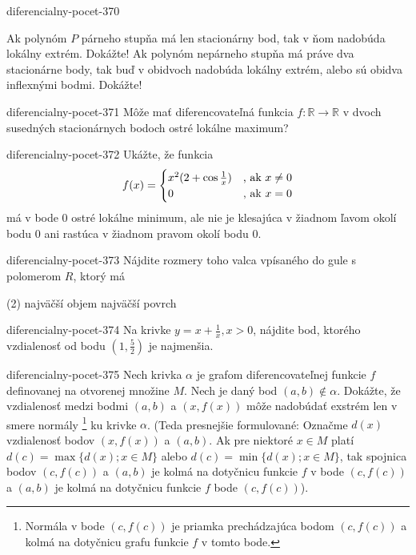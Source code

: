 \begin{defproblem}{diferencialny-pocet-370}
\begin{tasks}
\task
  Ak polynóm $P$ párneho stupňa má len stacionárny bod, tak v ňom nadobúda
  lokálny extrém. Dokážte!
\task
  Ak polynóm nepárneho stupňa má práve dva stacionárne body, tak buď v obidvoch
  nadobúda lokálny extrém, alebo sú obidva inflexnými bodmi. Dokážte!
\end{tasks}
\end{defproblem}

\begin{defproblem}{diferencialny-pocet-371}
Môže mať diferencovateľná funkcia $f:\mathbb{R} \rightarrow \mathbb{R}$ v dvoch
susedných stacionárnych bodoch ostré lokálne maximum?
\end{defproblem}

\begin{defproblem}{diferencialny-pocet-372}
Ukážte, že funkcia
\[
  f(x)=
    \begin{cases}
      x^2(2+\cos \frac{1}{x}) & $, ak $ x \neq 0 \\
      0 &  $, ak $ x=0
    \end{cases}
\]
má v bode $0$ ostré lokálne minimum, ale nie je klesajúca v žiadnom ľavom okolí
bodu $0$ ani rastúca v žiadnom pravom okolí bodu $0$.
\end{defproblem}

\begin{defproblem}{diferencialny-pocet-373}
Nájdite rozmery toho valca vpísaného do gule s polomerom $R$, ktorý má
\begin{tasks}(2)
\task najväčší objem
\task najväčší povrch
\end{tasks}
\end{defproblem}

\begin{defproblem}{diferencialny-pocet-374}
Na krivke $y=x+\frac{1}{x},x>0$, nájdite bod, ktorého vzdialenosť od bodu
$(1,\frac{5}{2})$ je najmenšia.
\end{defproblem}

\begin{defproblem}{diferencialny-pocet-375}
Nech krivka $\alpha$ je grafom diferencovateľnej funkcie $f$ definovanej na
otvorenej množine $M$. Nech je daný bod $(a,b)\notin \alpha$. Dokážte, že
vzdialenosť medzi bodmi $(a,b)$ a $(x,f(x))$ môže nadobúdať exstrém len v smere
normály \footnote{Normála v bode $(c,f(c))$ je priamka prechádzajúca bodom
$(c,f(c))$ a kolmá na dotyčnicu grafu funkcie $f$ v tomto bode.} ku krivke
$\alpha$. (Teda presnejšie formulované: Označme $d(x)$ vzdialenosť bodov
$(x,f(x))$ a $(a,b)$. Ak pre niektoré $x\in M$ platí $d(c)=\max \{d(x);x\in M\}$
alebo $d(c)=\min \{d(x);x\in M\}$, tak spojnica bodov $(c,f(c))$ a $(a,b)$ je
kolmá na dotyčnicu funkcie $f$ v bode $(c,f(c))$ a $(a,b)$ je kolmá na dotyčnicu
funkcie $f$  bode $(c,f(c))$).
\end{defproblem}

